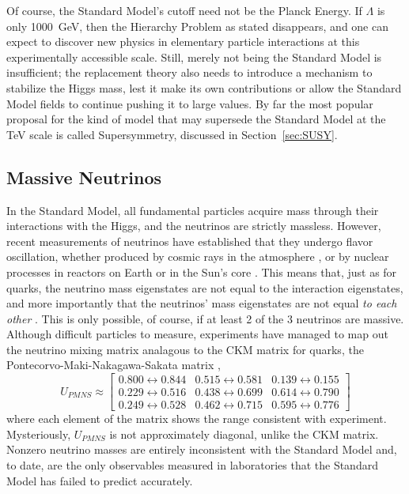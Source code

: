   Of course, the Standard Model's cutoff need not be the Planck Energy. 
  If $\Lambda$ is only 1000~GeV, then the Hierarchy Problem as stated disappears, and one can expect to discover new physics in elementary particle interactions at this experimentally accessible scale.
  Still, merely not being the Standard Model is insufficient; the replacement theory also needs to introduce a mechanism to stabilize the Higgs mass, lest it make its own contributions or allow the Standard Model fields to continue pushing it to large values.
  By far the most popular proposal for the kind of model that may supersede the Standard Model at the TeV scale is called Supersymmetry, discussed in Section~\ref{sec:SUSY}.

  \subsection{Massive Neutrinos} \label{sec:neutrinomasses}

  In the Standard Model, all fundamental particles acquire mass through their interactions with the Higgs, and the neutrinos are strictly massless.
  However, recent measurements of neutrinos have established that they undergo flavor oscillation, whether produced by cosmic rays in the atmosphere \cite{atmospheric_neutrinos}, or by nuclear processes in reactors on Earth \cite{reactor_neutrinos} or in the Sun's core \cite{solar_neutrinos}.
  This means that, just as for quarks, the neutrino mass eigenstates are not equal to the interaction eigenstates, and more importantly that the neutrinos' mass eigenstates are not equal {\it to each other} \cite{nufit}.
  This is only possible, of course, if at least 2 of the 3 neutrinos are massive.
  Although difficult particles to measure, experiments have managed to map out the neutrino mixing matrix analagous to the CKM matrix for quarks, the Pontecorvo-Maki-Nakagawa-Sakata matrix \cite{pdg},
  \begin{equation}
    U_{PMNS}
\approx
    \begin{bmatrix} 
      0.800 \leftrightarrow 0.844 & 0.515 \leftrightarrow 0.581 & 0.139 \leftrightarrow 0.155 \\
      0.229 \leftrightarrow 0.516 & 0.438 \leftrightarrow 0.699 & 0.614 \leftrightarrow 0.790 \\
      0.249 \leftrightarrow 0.528 & 0.462 \leftrightarrow 0.715 & 0.595 \leftrightarrow 0.776 
    \end{bmatrix}
  \end{equation}
  where each element of the matrix shows the range consistent with experiment.
  Mysteriously, $U_{PMNS}$ is not approximately diagonal, unlike the CKM matrix.
  Nonzero neutrino masses are entirely inconsistent with the Standard Model and, to date, are the only observables measured in laboratories that the Standard Model has failed to predict accurately.

